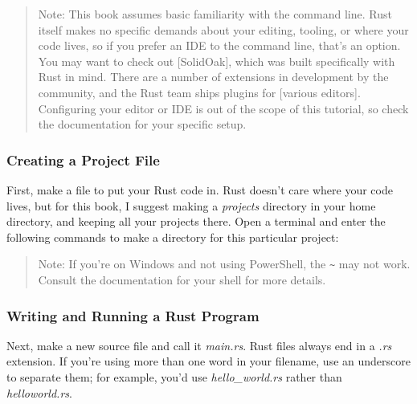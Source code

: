 \documentclass[a4paper,]{book}
\newenvironment{Shaded}{\begin{snugshade}}{\end{snugshade}}
\newcommand{\KeywordTok}[1]{\textcolor[rgb]{0.13,0.29,0.53}{\textbf{{#1}}}}
\newcommand{\NormalTok}[1]{{#1}}
\begin{document}
\begin{quote}
Note: This book assumes basic familiarity with the command line. Rust
itself makes no specific demands about your editing, tooling, or where
your code lives, so if you prefer an IDE to the command line, that's an
option. You may want to check out {[}SolidOak{]}, which was built
specifically with Rust in mind. There are a number of extensions in
development by the community, and the Rust team ships plugins for
{[}various editors{]}. Configuring your editor or IDE is out of the
scope of this tutorial, so check the documentation for your specific
setup.
\end{quote}

\subsubsection{Creating a Project File}\label{creating-a-project-file}

First, make a file to put your Rust code in. Rust doesn't care where
your code lives, but for this book, I suggest making a \emph{projects}
directory in your home directory, and keeping all your projects there.
Open a terminal and enter the following commands to make a directory for
this particular project:

\begin{Shaded}
\end{Shaded}

\begin{quote}
Note: If you're on Windows and not using PowerShell, the
\texttt{\textasciitilde{}} may not work. Consult the documentation for
your shell for more details.
\end{quote}

\subsubsection{Writing and Running a Rust
Program}\label{writing-and-running-a-rust-program}

Next, make a new source file and call it \emph{main.rs}. Rust files
always end in a \emph{.rs} extension. If you're using more than one word
in your filename, use an underscore to separate them; for example, you'd
use \emph{hello\_world.rs} rather than \emph{helloworld.rs}.
\end{document}
